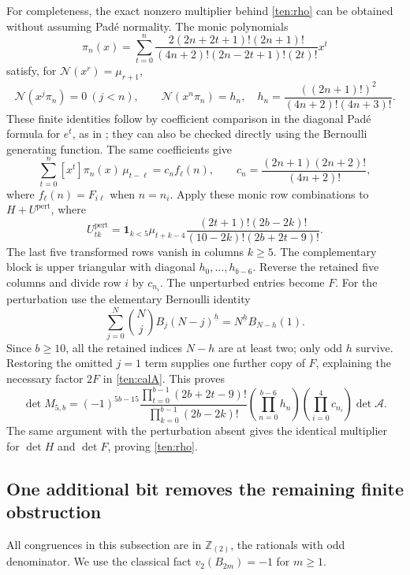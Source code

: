 \documentclass[11pt]{article}
\theoremstyle{definition}
\theoremstyle{remark}
\numberwithin{equation}{section}
\begin{document}
For completeness, the exact nonzero multiplier behind
\eqref{ten:rho} can be obtained without assuming Pad\'e normality.
The monic polynomials
\[
 \pi_n(x)=\sum_{t=0}^{n}
 \frac{2(2n+2t+1)!(2n+1)!}
 {(4n+2)!(2n-2t+1)!(2t)!}x^t
\]
satisfy, for $\mathcal N(x^r)=\mu_{r+1}$,
\[
 \mathcal N(x^j\pi_n)=0\ (j<n),\qquad
 \mathcal N(x^n\pi_n)=h_n,
 \quad h_n=\frac{((2n+1)!)^2}{(4n+2)!(4n+3)!}.
\]
These finite identities follow by coefficient comparison in the
diagonal Pad\'e formula for $e^t$, as in \cite{QuarticIncoming}; they
can also be checked directly using the Bernoulli generating function.
The same coefficients give
\[
 \sum_{t=0}^{n}[x^t]\pi_n(x)\,\mu_{t-\ell}
 =c_n f_\ell(n),\qquad
 c_n=\frac{(2n+1)(2n+2)!}{(4n+2)!},
\]
where $f_\ell(n)=F_{i\ell}$ when $n=n_i$.
Apply these monic row combinations to
$H+U^{\mathrm{pert}}$, where
\[
 U^{\mathrm{pert}}_{tk}
 =\mathbf1_{k<5}\mu_{t+k-4}
 \frac{(2t+1)!(2b-2k)!}{(10-2k)!(2b+2t-9)!}.
\]
The last five transformed rows vanish in columns $k\ge5$.
The complementary block is upper triangular with diagonal
$h_0,\ldots,h_{b-6}$.  Reverse the retained five columns and
divide row $i$ by $c_{n_i}$.  The unperturbed entries become $F$.
For the perturbation use the elementary Bernoulli identity
\[
 \sum_{j=0}^{N}\binom Nj B_j(N-j)^{\underline h}
       =N^{\underline h}B_{N-h}(1).
\]
Since $b\ge10$, all the retained indices $N-h$ are at least two;
only odd $h$ survive.  Restoring the omitted $j=1$ term supplies
one further copy of $F$, explaining the necessary factor $2F$
in \eqref{ten:calA}.  This proves
\begin{equation}\label{ten:multiplier}
 \det M_{5,b}=(-1)^{5b-15}
 \frac{\prod_{t=0}^{b-1}(2b+2t-9)!}
      {\prod_{k=0}^{b-1}(2b-2k)!}
 \left(\prod_{n=0}^{b-6}h_n\right)
 \left(\prod_{i=0}^{4}c_{n_i}\right)\det\mathcal A.
\end{equation}
The same argument with the perturbation absent gives the identical
multiplier for $\det H$ and $\det F$, proving \eqref{ten:rho}.

\subsection{One additional bit removes the remaining finite obstruction}

All congruences in this subsection are in $\mathbb Z_{(2)}$,
the rationals with odd denominator.  We use the classical fact
$v_2(B_{2m})=-1$ for $m\ge1$.
\end{document}
